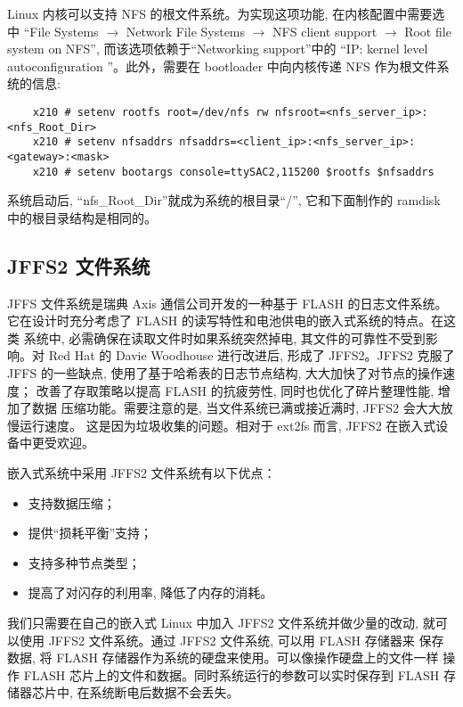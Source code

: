 	Linux 内核可以支持 NFS 的根文件系统。为实现这项功能, 在内核配置中需要选中
``File Systems $\to$ Network File Systems $\to$  NFS client support  $\to$
 Root file system on NFS'', 而该选项依赖于``Networking support''中的
``IP: kernel level autoconfiguration ''。此外，需要在 bootloader 中向内核传递
NFS 作为根文件系统的信息:

\begin{boxedminipage}{.9\textwidth}
\begin{verbatim}
	x210 # setenv rootfs root=/dev/nfs rw nfsroot=<nfs_server_ip>:<nfs_Root_Dir>
	x210 # setenv nfsaddrs nfsaddrs=<client_ip>:<nfs_server_ip>:<gateway>:<mask>
	x210 # setenv bootargs console=ttySAC2,115200 $rootfs $nfsaddrs
\end{verbatim}
\end{boxedminipage}

	系统启动后, ``nfs\_Root\_Dir''就成为系统的根目录``/'', 它和下面制作的
ramdisk 中的根目录结构是相同的。

\subsection{JFFS2 文件系统}
	JFFS 文件系统是瑞典 Axis 通信公司开发的一种基于 FLASH 的日志文件系统。
它在设计时充分考虑了 FLASH 的读写特性和电池供电的嵌入式系统的特点。在这类
系统中, 必需确保在读取文件时如果系统突然掉电, 其文件的可靠性不受到影响。对
Red Hat 的 Davie Woodhouse 进行改进后, 形成了 JFFS2。JFFS2 克服了 JFFS
的一些缺点, 使用了基于哈希表的日志节点结构, 大大加快了对节点的操作速度；
改善了存取策略以提高 FLASH 的抗疲劳性, 同时也优化了碎片整理性能, 增加了数据
压缩功能。需要注意的是, 当文件系统已满或接近满时, JFFS2 会大大放慢运行速度。
这是因为垃圾收集的问题。相对于 ext2fs 而言, JFFS2 在嵌入式设备中更受欢迎。

	嵌入式系统中采用 JFFS2 文件系统有以下优点：
\begin{itemize}\itemsep=-3pt
  \item 支持数据压缩；
  \item 提供``损耗平衡''支持；
  \item 支持多种节点类型；
  \item 提高了对闪存的利用率, 降低了内存的消耗。
\end{itemize}

	我们只需要在自己的嵌入式 Linux 中加入 JFFS2 文件系统并做少量的改动, 
就可以使用 JFFS2 文件系统。通过 JFFS2 文件系统, 可以用 FLASH 存储器来
保存数据, 将 FLASH 存储器作为系统的硬盘来使用。可以像操作硬盘上的文件一样
操作 FLASH 芯片上的文件和数据。同时系统运行的参数可以实时保存到 FLASH
存储器芯片中, 在系统断电后数据不会丢失。

